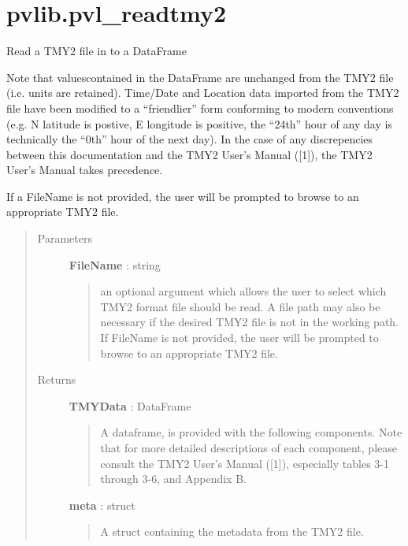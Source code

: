 \documentclass[letterpaper,10pt,english]{sphinxmanual}
\begin{document}
\section{pvlib.pvl\_readtmy2}
\label{stubs/pvlib.pvl_readtmy2::doc}\label{stubs/pvlib.pvl_readtmy2:pvlib-pvl-readtmy2}

\begin{fulllineitems}
\label{stubs/pvlib.pvl_readtmy2:pvlib.pvl_readtmy2}
Read a TMY2 file in to a DataFrame

Note that valuescontained in the DataFrame are unchanged from the TMY2 
file (i.e. units  are retained). Time/Date and Location data imported from the 
TMY2 file have been modified to a ``friendlier'' form conforming to modern
conventions (e.g. N latitude is postive, E longitude is positive, the
``24th'' hour of any day is technically the ``0th'' hour of the next day).
In the case of any discrepencies between this documentation and the 
TMY2 User's Manual ({[}1{]}), the TMY2 User's Manual takes precedence.

If a FileName is not provided, the user will be prompted to browse to
an appropriate TMY2 file.
\begin{quote}\begin{description}
\item[{Parameters}] \leavevmode
\textbf{FileName} : string
\begin{quote}

an optional argument which allows the user to select which
TMY2 format file should be read. A file path may also be necessary if
the desired TMY2 file is not in the working path. If FileName
is not provided, the user will be prompted to browse to an
appropriate TMY2 file.
\end{quote}

\item[{Returns}] \leavevmode
\textbf{TMYData} : DataFrame
\begin{quote}

A dataframe, is provided with the following components.  Note
that for more detailed descriptions of each component, please consult
the TMY2 User's Manual ({[}1{]}), especially tables 3-1 through 3-6, and 
Appendix B.
\end{quote}

\textbf{meta} : struct
\begin{quote}

A struct containing the metadata from the TMY2 file.
\end{quote}


\end{description}
\end{quote}
\end{fulllineitems}
\end{document}
